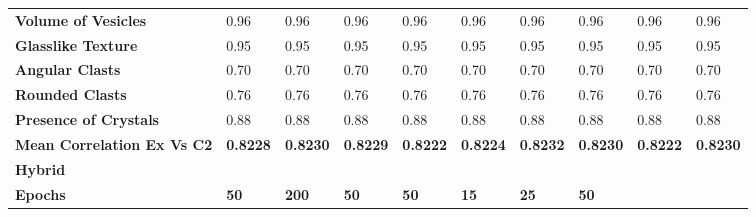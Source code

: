 \begin{longtable}[c]{@{}llllllllll@{}}
\textbf{Volume of Vesicles} &
  \cellcolor[HTML]{F8CBAD}0.96 &
  \cellcolor[HTML]{C6E0B4}0.96 &
  \cellcolor[HTML]{FFE699}0.96 &
  \cellcolor[HTML]{B4C6E7}0.96 &
  \cellcolor[HTML]{FCE4D6}0.96 &
  \cellcolor[HTML]{E2EFDA}0.96 &
  \cellcolor[HTML]{FFF2CC}0.96 &
  \cellcolor[HTML]{DDEBF7}0.96 &
  \cellcolor[HTML]{D6DCE4}0.96 \\
\textbf{Glasslike Texture} &
  \cellcolor[HTML]{F8CBAD}0.95 &
  \cellcolor[HTML]{C6E0B4}0.95 &
  \cellcolor[HTML]{FFE699}0.95 &
  \cellcolor[HTML]{B4C6E7}0.95 &
  \cellcolor[HTML]{FCE4D6}0.95 &
  \cellcolor[HTML]{E2EFDA}0.95 &
  \cellcolor[HTML]{FFF2CC}0.95 &
  \cellcolor[HTML]{DDEBF7}0.95 &
  \cellcolor[HTML]{D6DCE4}0.95 \\
\textbf{Angular Clasts} &
  \cellcolor[HTML]{F8CBAD}0.70 &
  \cellcolor[HTML]{C6E0B4}0.70 &
  \cellcolor[HTML]{FFE699}0.70 &
  \cellcolor[HTML]{B4C6E7}0.70 &
  \cellcolor[HTML]{FCE4D6}0.70 &
  \cellcolor[HTML]{E2EFDA}0.70 &
  \cellcolor[HTML]{FFF2CC}0.70 &
  \cellcolor[HTML]{DDEBF7}0.70 &
  \cellcolor[HTML]{D6DCE4}0.70 \\
\textbf{Rounded Clasts} &
  \cellcolor[HTML]{F8CBAD}0.76 &
  \cellcolor[HTML]{C6E0B4}0.76 &
  \cellcolor[HTML]{FFE699}0.76 &
  \cellcolor[HTML]{B4C6E7}0.76 &
  \cellcolor[HTML]{FCE4D6}0.76 &
  \cellcolor[HTML]{E2EFDA}0.76 &
  \cellcolor[HTML]{FFF2CC}0.76 &
  \cellcolor[HTML]{DDEBF7}0.76 &
  \cellcolor[HTML]{D6DCE4}0.76 \\
\textbf{Presence of Crystals} &
  \cellcolor[HTML]{F8CBAD}0.88 &
  \cellcolor[HTML]{C6E0B4}0.88 &
  \cellcolor[HTML]{FFE699}0.88 &
  \cellcolor[HTML]{B4C6E7}0.88 &
  \cellcolor[HTML]{FCE4D6}0.88 &
  \cellcolor[HTML]{E2EFDA}0.88 &
  \cellcolor[HTML]{FFF2CC}0.88 &
  \cellcolor[HTML]{DDEBF7}0.88 &
  \cellcolor[HTML]{D6DCE4}0.88 \\
\cellcolor[HTML]{FFFF00}\textbf{Mean Correlation Ex Vs C2} &
  \textbf{0.8228} &
  \textbf{0.8230} &
  \textbf{0.8229} &
  \textbf{0.8222} &
  \textbf{0.8224} &
  \textbf{0.8232} &
  \textbf{0.8230} &
  \textbf{0.8222} &
  \textbf{0.8230} \\
\rowcolor[HTML]{E7E6E6} 
\textbf{Hybrid} &
   &
  \textbf{} &
  \textbf{} &
  \textbf{} &
  \textbf{} &
  \textbf{} &
  \textbf{} &
  \textbf{} &
  \textbf{} \\
\textbf{Epochs} &
  \cellcolor[HTML]{F8CBAD}\textbf{50} &
  \cellcolor[HTML]{C6E0B4}\textbf{200} &
  \cellcolor[HTML]{FFE699}\textbf{50} &
  \cellcolor[HTML]{B4C6E7}\textbf{50} &
  \cellcolor[HTML]{FCE4D6}\textbf{15} &
  \cellcolor[HTML]{E2EFDA}\textbf{25} &
  \cellcolor[HTML]{FFF2CC}\textbf{50} &

\end{longtable}
